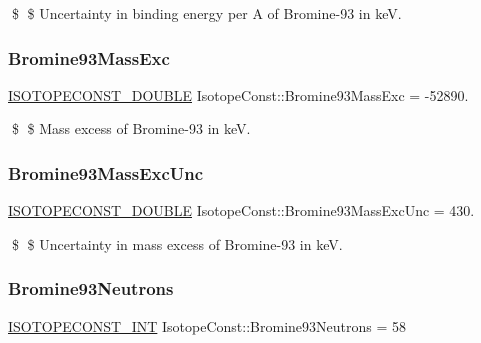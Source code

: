 \$ \$ Uncertainty in binding energy per A of Bromine-\/93 in keV. \mbox{\label{group___isotope_const-_bromine-_br93_ga4dd6e64ae68414182eb0e2f55da1c92d}} 
\subsubsection{\texorpdfstring{Bromine93\+Mass\+Exc}{Bromine93MassExc}}
{\footnotesize\ttfamily \mbox{\hyperlink{group___isotope_const-_macros_ga8f45a7272ce02c0b4c65c44636ed719a}{I\+S\+O\+T\+O\+P\+E\+C\+O\+N\+S\+T\+\_\+\+D\+O\+U\+B\+LE}} Isotope\+Const\+::\+Bromine93\+Mass\+Exc = -\/52890.}

\$ \$ Mass excess of Bromine-\/93 in keV. \mbox{\label{group___isotope_const-_bromine-_br93_ga9da4a587dd0c7e670cc1ae35d4faf3d7}} 
\subsubsection{\texorpdfstring{Bromine93\+Mass\+Exc\+Unc}{Bromine93MassExcUnc}}
{\footnotesize\ttfamily \mbox{\hyperlink{group___isotope_const-_macros_ga8f45a7272ce02c0b4c65c44636ed719a}{I\+S\+O\+T\+O\+P\+E\+C\+O\+N\+S\+T\+\_\+\+D\+O\+U\+B\+LE}} Isotope\+Const\+::\+Bromine93\+Mass\+Exc\+Unc = 430.}

\$ \$ Uncertainty in mass excess of Bromine-\/93 in keV. \mbox{\label{group___isotope_const-_bromine-_br93_gad734c00b8a8906a6b5ccbaeca9feb97b}} 
\subsubsection{\texorpdfstring{Bromine93\+Neutrons}{Bromine93Neutrons}}
{\footnotesize\ttfamily \mbox{\hyperlink{group___isotope_const-_macros_ga5f18360b3e99483a35c32d789e62621c}{I\+S\+O\+T\+O\+P\+E\+C\+O\+N\+S\+T\+\_\+\+I\+NT}} Isotope\+Const\+::\+Bromine93\+Neutrons = 58}

